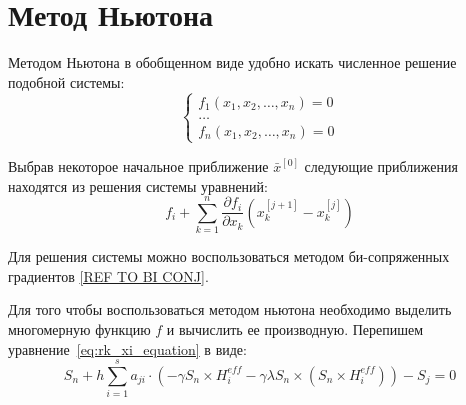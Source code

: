 \section{Метод Ньютона}
Методом Ньютона в обобщенном виде удобно искать численное решение подобной
системы:
\begin{equation}\label{eq:newton_base}
    \begin{cases}
        f_1(x_1, x_2, \dots, x_n) = 0\\
        \dots\\
        f_n(x_1, x_2, \dots, x_n) = 0
    \end{cases}
\end{equation}

Выбрав некоторое начальное приближение $\bar x^{[0]}$ следующие приближения находятся
из решения системы уравнений:
\begin{equation}\label{eq:newton_generalized_iteration}
    f_i + \sum_{k=1}^n \frac{\partial f_i}{\partial x_k}
    (x_k^{[j+1]}-x_k^{[j]})
\end{equation}

\begin{remark}
    Для решения системы можно воспользоваться методом би-сопряженных градиентов
    \ref{REF TO BI CONJ}.
\end{remark}

Для того чтобы воспользоваться методом ньютона необходимо выделить
многомерную функцию $f$ и вычислить ее производную. Перепишем
уравнение~\ref{eq:rk_xi_equation} в виде:
\begin{equation}
    S_n + h\sum_{i=1}^s a_{ji}\cdot \left(
        -\gamma S_n \times H^{eff}_{i} - \gamma\lambda S_n \times
    \left(S_n \times H^{eff}_{i}\right)\right) - S_j = 0
    \label{eq:equation_in_newton_form}
\end{equation}

